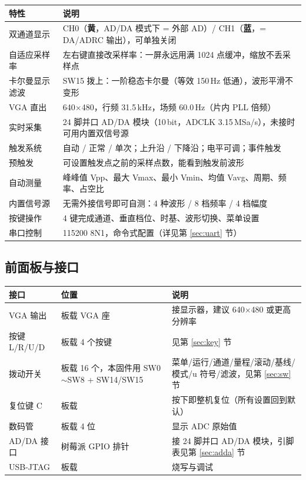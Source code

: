 \documentclass[UTF8,a4paper,11pt]{ctexart}
\begin{document}
\begin{center}
\small
\begin{tabular}{ll}
\toprule
特性 & 说明\\
\midrule
双通道显示 & CH0（\textbf{黄}，AD/DA 模式下 = 外部 AD）/ CH1（\textbf{蓝}，= DA/ADRC 输出），可单独关闭\\
自适应采样率 & 左右键直接改采样率：一屏永远用满 1024 点缓冲，缩放不丢采样点\\
卡尔曼显示滤波 & SW15 拨上：一阶稳态卡尔曼（等效 150\,Hz 低通），波形平滑不变形\\
VGA 直出 & 640$\times$480，行频 31.5\,kHz，场频 60.0\,Hz（片内 PLL 倍频）\\
实时采集 & 24 脚并口 AD/DA 模块（10\,bit，ADCLK 3.15\,MSa/s），未接时可用内置双信号源\\
触发系统 & 自动 / 正常 / 单次；上升沿 / 下降沿；电平可调；事件触发\\
预触发 & 可设置触发点之前的采样点数，能看到触发前波形\\
自动测量 & 峰峰值 Vpp、最大 Vmax、最小 Vmin、均值 Vavg、周期、频率、占空比\\
内置信号源 & 无需外接信号即可自测：4 种波形 / 8 档频率 / 4 档幅度\\
按键操作 & 4 键完成通道、垂直档位、时基、波形切换、菜单设置\\
串口控制 & 115200 8N1，命令式配置（详见第 \ref{sec:uart} 节）\\
\bottomrule
\end{tabular}
\end{center}

\subsection{前面板与接口}

\begin{center}
\small
\begin{tabular}{lll}
\toprule
接口 & 位置 & 说明\\
\midrule
VGA 输出 & 板载 VGA 座 & 接显示器，建议 640$\times$480 或更高分辨率\\
按键 L/R/U/D & 板载 4 个按键 & 见第 \ref{sec:key} 节\\
拨动开关 & 板载 16 个，本固件用 SW0$\sim$SW8 + SW14/SW15 & 菜单/运行/通道/量程/滚动/基线/模式/u 符号/滤波，见第 \ref{sec:sw} 节\\
复位键 C & 板载 & 按下即整机复位（所有设置回到默认）\\
数码管 & 板载 4 位 & 显示 ADC 原始值\\
AD/DA 接口 & 树莓派 GPIO 排针 & 接 24 脚并口 AD/DA 模块，引脚表见第 \ref{sec:adda} 节\\
USB-JTAG & 板载 & 烧写与调试\\
\bottomrule
\end{tabular}
\end{center}
\end{document}

